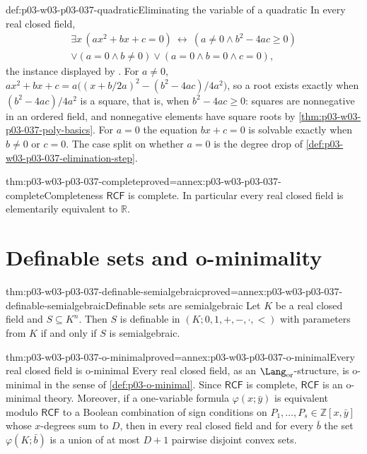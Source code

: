 \begin{hbexample}{def:p03-w03-p03-037-quadratic}{Eliminating the variable of a quadratic}
In every real closed field,
\begin{multline*}
\exists x\,(ax^2+bx+c=0)\ \longleftrightarrow\
(a\neq0\wedge b^2-4ac\geq0)\\ \vee(a=0\wedge b\neq0)\vee(a=0\wedge b=0\wedge c=0),
\end{multline*}
the instance displayed by \cite[p.~11]{Coste2002SAG}.  For \(a\neq0\),
\(ax^2+bx+c=a\bigl((x+b/2a)^2-(b^2-4ac)/4a^2\bigr)\), so a root exists exactly
when \((b^2-4ac)/4a^2\) is a square, that is, when \(b^2-4ac\geq0\): squares
are nonnegative in an ordered field, and nonnegative elements have square
roots by \cref{thm:p03-w03-p03-037-poly-basics}.  For \(a=0\) the equation
\(bx+c=0\) is solvable exactly when \(b\neq0\) or \(c=0\).  The case split
on whether \(a=0\) is the degree drop of
\cref{def:p03-w03-p03-037-elimination-step}.
\end{hbexample}

\begin{hbcorollary}{thm:p03-w03-p03-037-complete}{proved=annex:p03-w03-p03-037-complete}{Completeness}
\(\mathsf{RCF}\) is complete.  In particular every real closed field is
elementarily equivalent to \(\mathbb R\).
\end{hbcorollary}

\section{Definable sets and o-minimality}
\label{sec:p03-w03-p03-037-definable}

\begin{hbtheorem}{thm:p03-w03-p03-037-definable-semialgebraic}{proved=annex:p03-w03-p03-037-definable-semialgebraic}{Definable sets are semialgebraic}
Let \(K\) be a real closed field and \(S\subseteq K^n\).  Then \(S\) is
definable in \((K;0,1,+,-,\mathbin{\cdot},<)\) with parameters from \(K\) if
and only if \(S\) is semialgebraic.
\end{hbtheorem}

\begin{hbtheorem}{thm:p03-w03-p03-037-o-minimal}{proved=annex:p03-w03-p03-037-o-minimal}{Every real closed field is o-minimal}
Every real closed field, as an \(\Lang_{\mathrm{or}}\)-structure, is
o-minimal in the sense of \cref{def:p03-o-minimal}.  Since \(\mathsf{RCF}\)
is complete, \(\mathsf{RCF}\) is an o-minimal theory.  Moreover, if a
one-variable formula \(\varphi(x;\bar y)\) is equivalent modulo
\(\mathsf{RCF}\) to a Boolean combination of sign conditions on
\(P_1,\dots,P_s\in\mathbb Z[x,\bar y]\) whose \(x\)-degrees sum to \(D\), then
in every real closed field and for every \(\bar b\) the set
\(\varphi(K;\bar b)\) is a union of at most \(D+1\) pairwise disjoint convex
sets.
\end{hbtheorem}

